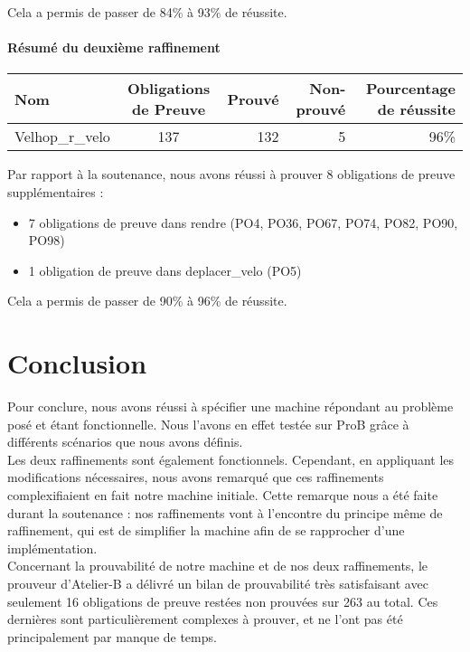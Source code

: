 \documentclass[12pt]{article}
\begin{document}
Cela a permis de passer de 84\% à 93\% de réussite.

\paragraph{Résumé du deuxième raffinement}
\begin{center}
	\begin{tabular}{| l | c | r | r|r|}
		\hline
		Nom & Obligations de Preuve & Prouvé & Non-prouvé & Pourcentage de réussite\\ \hline
    Velhop\_r\_velo & 137 & 132 & 5 & 96\% \\ \hline
	\end{tabular}
\end{center}

Par rapport à la soutenance, nous avons réussi à prouver 8 obligations de preuve supplémentaires :
\begin{itemize}
  \item 7 obligations de preuve dans rendre (PO4, PO36, PO67, PO74, PO82, PO90, PO98)
  \item 1 obligation de preuve dans deplacer\_velo (PO5)
\end{itemize}

Cela a permis de passer de 90\% à 96\% de réussite.

\newpage
\section{Conclusion}

Pour conclure, nous avons réussi à spécifier une machine répondant au problème posé et étant fonctionnelle. Nous l'avons en effet testée sur ProB grâce à différents scénarios que nous avons définis. \\

Les deux raffinements sont également fonctionnels. Cependant, en appliquant les modifications nécessaires, nous avons remarqué que ces raffinements complexifiaient en fait notre machine initiale. Cette remarque nous a été faite durant la soutenance : nos raffinements vont à l'encontre du principe même de raffinement, qui est de simplifier la machine afin de se rapprocher d'une implémentation.\\

Concernant la prouvabilité de notre machine et de nos deux raffinements, le prouveur d'Atelier-B a délivré un bilan de prouvabilité très satisfaisant avec seulement 16 obligations de preuve restées non prouvées sur 263 au total. Ces dernières sont particulièrement complexes à prouver, et ne l'ont pas été principalement par manque de temps.
\end{document}
